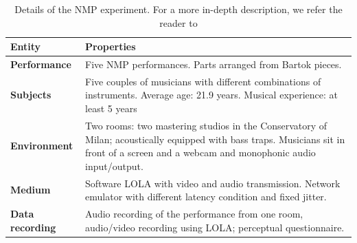 \documentclass[conference]{IEEEtran}
\begin{document}
\begin{table}[b]
	\centering
	\caption{Details of the NMP experiment. For a more in-depth description, we refer the reader to \cite{CIM2018} }
	\begin{tabular}{p{1.5cm}p{6cm}}
		\hline
		\textbf{Entity} & \textbf{Properties} \\
		\hline
		\textbf{Performance} & Five NMP performances. \newline  Parts arranged from Bartok pieces. \\
		\textbf{Subjects} & Five couples of musicians with different combinations of instruments. Average age: 21.9 years. Musical experience: at least 5 years\\
		\textbf{Environment} & Two rooms: two mastering studios in the Conservatory of Milan; acoustically equipped with bass traps. Musicians sit in front of a screen and a webcam and monophonic audio input/output.\\
		\textbf{Medium} & Software LOLA with video and audio transmission. Network emulator with different latency condition and fixed jitter. \\
		\textbf{Data} \newline \textbf{recording} & Audio recording of the performance from one room, audio/video recording using LOLA; perceptual questionnaire.\\
		\hline
	\end{tabular}
	\label{tab:exp2}
\end{table}
\end{document}
